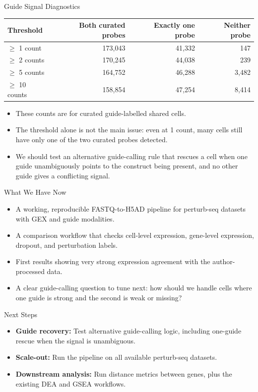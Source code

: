 \documentclass[handout,aspectratio=169]{beamer}
\begin{document}
\begin{frame}{Guide Signal Diagnostics}
    \centering
    \begin{tabular}{lrrr}
        \toprule
        \textbf{Threshold} & \textbf{Both curated probes} & \textbf{Exactly one probe} & \textbf{Neither probe} \\
        \midrule
        $\geq$ 1 count & 173,043 & 41,332 & 147 \\
        $\geq$ 2 counts & 170,245 & 44,038 & 239 \\
        $\geq$ 5 counts & 164,752 & 46,288 & 3,482 \\
        $\geq$ 10 counts & 158,854 & 47,254 & 8,414 \\
        \bottomrule
    \end{tabular}
    \vspace{1.0em}
    \begin{itemize}
        \item These counts are for curated guide-labelled shared cells.
        \item The threshold alone is not the main issue: even at 1 count, many cells still have only one of the two curated probes detected.
        \item We should test an alternative guide-calling rule that rescues a cell when one guide unambiguously points to the construct being present, and no other guide gives a conflicting signal.
    \end{itemize}
\end{frame}

\begin{frame}{What We Have Now}
    \begin{itemize}
        \item A working, reproducible FASTQ-to-H5AD pipeline for perturb-seq datasets with GEX and guide modalities.
        \item A comparison workflow that checks cell-level expression, gene-level expression, dropout, and perturbation labels.
        \item First results showing very strong expression agreement with the author-processed data.
        \item A clear guide-calling question to tune next: how should we handle cells where one guide is strong and the second is weak or missing?
    \end{itemize}
\end{frame}

\begin{frame}{Next Steps}
    \begin{itemize}
        \item \textbf{Guide recovery:} Test alternative guide-calling logic, including one-guide rescue when the signal is unambiguous.
        \item \textbf{Scale-out:} Run the pipeline on all available perturb-seq datasets.
        \item \textbf{Downstream analysis:} Run distance metrics between genes, plus the existing DEA and GSEA workflows.
    \end{itemize}
\end{frame}
\end{document}

